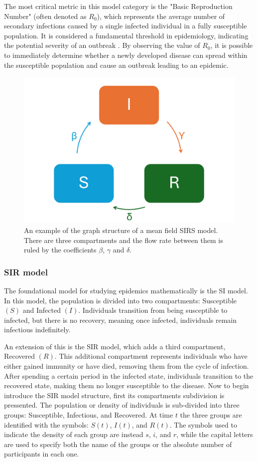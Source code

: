 The most critical metric in this model category is the "Basic Reproduction Number" (often denoted as $R_0$), which represents the average number of secondary infections caused by a single infected individual in a fully susceptible population. It is considered a fundamental threshold in epidemiology, indicating the potential severity of an outbreak \cite{Hernandez_Vargas_2022}. By observing the value of $R_0$, it is possible to immediately determine whether a newly developed disease can spread within the susceptible population and cause an outbreak leading to an epidemic.
\begin{figure}[]
	\centering
	\includegraphics[width=0.65\linewidth]{0_introduction/images_introduction/SIRS_figure_compartmental}
	\caption[SIRS example]{An example of the graph structure of a mean field SIRS model. There are three compartments and the flow rate between them is ruled by the coefficients $\beta$, $\gamma$ and $\delta$.}
	\label{fig:sirsfigurecompartmental}
\end{figure}


\subsubsection{SIR model}
\label{subsec:SIR}
The foundational model for studying epidemics mathematically is the SI model. In this model, the population is divided into two compartments: Susceptible $(S)$ and Infected $(I)$. Individuals transition from being susceptible to infected, but there is no recovery, meaning once infected, individuals remain infectious indefinitely.

An extension of this is the SIR model, which adds a third compartment, Recovered $(R)$. This additional compartment represents individuals who have either gained immunity or have died, removing them from the cycle of infection. After spending a certain period in the infected state, individuals transition to the recovered state, making them no longer susceptible to the disease.
Now to begin introduce the SIR model structure, first its compartments subdivision is pressented. The population or density of individuals is sub-divided into three groups: Susceptible, Infectious, and Recovered. At time $t$ the three groups are identified with the symbols: $S(t)$, $I(t)$, and $R(t)$. 
The symbols used to indicate the density of each group are instead $s$, $i$, and $r$, while the capital letters are used to specify both the name of the groups or the absolute number of participants in each one. 

